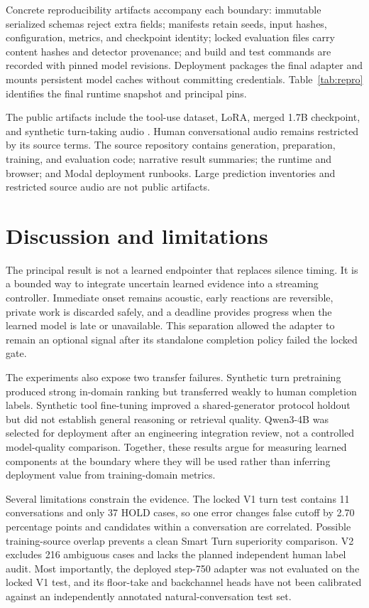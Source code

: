 \documentclass[10pt,twocolumn]{article}
\begin{document}
Concrete reproducibility artifacts accompany each boundary: immutable serialized schemas reject
extra fields; manifests retain seeds, input hashes, configuration, metrics, and checkpoint identity;
locked evaluation files carry content hashes and detector provenance; and build and test commands
are recorded with pinned model revisions. Deployment packages the final adapter and mounts
persistent model caches without committing credentials. Table~\ref{tab:repro} identifies the final
runtime snapshot and principal pins.

The public artifacts include the tool-use dataset, LoRA, merged 1.7B checkpoint, and synthetic
turn-taking audio \cite{tooldata,toollora,toolmerged,turndata}. Human conversational audio remains
restricted by its source terms. The source repository contains generation, preparation, training,
and evaluation code; narrative result summaries; the runtime and browser; and Modal deployment
runbooks. Large prediction inventories and restricted source audio are not public artifacts.

\FloatBarrier
\section{Discussion and limitations}

The principal result is not a learned endpointer that replaces silence timing. It is a bounded way
to integrate uncertain learned evidence into a streaming controller. Immediate onset remains
acoustic, early reactions are reversible, private work is discarded safely, and a deadline provides
progress when the learned model is late or unavailable. This separation allowed the adapter to
remain an optional signal after its standalone completion policy failed the locked gate.

The experiments also expose two transfer failures. Synthetic turn pretraining produced strong
in-domain ranking but transferred weakly to human completion labels. Synthetic tool fine-tuning
improved a shared-generator protocol holdout but did not establish general reasoning or retrieval
quality. Qwen3-4B was selected for deployment after an engineering integration review, not a
controlled model-quality comparison. Together, these results argue for measuring learned
components at the boundary where they will be used rather than inferring deployment value from
training-domain metrics.

Several limitations constrain the evidence. The locked V1 turn test contains 11 conversations and
only 37 HOLD cases, so one error changes false cutoff by 2.70 percentage points and candidates within
a conversation are correlated. Possible training-source overlap prevents a clean Smart Turn
superiority comparison. V2 excludes 216 ambiguous cases and lacks the planned independent human
label audit. Most importantly, the deployed step-750 adapter was not evaluated on the locked V1
test, and its floor-take and backchannel heads have not been calibrated against an independently
annotated natural-conversation test set.
\end{document}
